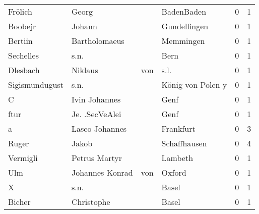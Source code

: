 \begin{tabular}{llllrr}
                  Frölich &                              Georg &             &                                  BadenBaden &          0 &         1 \\
                  Boobejr &                             Johann &             &                                Gundelfingen &          0 &         1 \\
                  Bertiin &                      Bartholomaeus &             &                                   Memmingen &          0 &         1 \\
                Sechelles &                               s.n. &             &                                        Bern &          0 &         1 \\
                 Dlesbach &                            Niklaus &         von &                                        s.l. &          0 &         1 \\
           Sigismundugust &                               s.n. &             &                           König von Polen y &          0 &         1 \\
                        C &                      Ivin Johannes &             &                                        Genf &          0 &         1 \\
                     ftur &                     Je. .SecVeAlei &             &                                        Genf &          0 &         1 \\
                        a &                     Lasco Johannes &             &                                   Frankfurt &          0 &         3 \\
                    Ruger &                              Jakob &             &                                Schaffhausen &          0 &         4 \\
                 Vermigli &                      Petrus Martyr &             &                                     Lambeth &          0 &         1 \\
                      Ulm &                    Johannes Konrad &         von &                                      Oxford &          0 &         1 \\
                        X &                               s.n. &             &                                       Basel &          0 &         1 \\
                   Bicher &                         Christophe &             &                                       Basel &          0 &         1 \\

\end{tabular}
